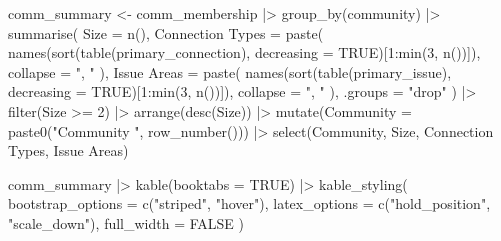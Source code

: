 \documentclass[
  letterpaper,
  DIV=11,
  numbers=noendperiod]{scrartcl}
\newenvironment{Shaded}{\begin{snugshade}}{\end{snugshade}}
\newcommand{\AttributeTok}[1]{\textcolor[rgb]{0.40,0.45,0.13}{#1}}
\newcommand{\ConstantTok}[1]{\textcolor[rgb]{0.56,0.35,0.01}{#1}}
\newcommand{\DecValTok}[1]{\textcolor[rgb]{0.68,0.00,0.00}{#1}}
\newcommand{\FunctionTok}[1]{\textcolor[rgb]{0.28,0.35,0.67}{#1}}
\newcommand{\NormalTok}[1]{\textcolor[rgb]{0.00,0.23,0.31}{#1}}
\newcommand{\OtherTok}[1]{\textcolor[rgb]{0.00,0.23,0.31}{#1}}
\newcommand{\SpecialCharTok}[1]{\textcolor[rgb]{0.37,0.37,0.37}{#1}}
\newcommand{\StringTok}[1]{\textcolor[rgb]{0.13,0.47,0.30}{#1}}
\begin{document}
\begin{Shaded}
\begin{Highlighting}[]
\NormalTok{comm\_summary }\OtherTok{\textless{}{-}}\NormalTok{ comm\_membership }\SpecialCharTok{|\textgreater{}}
  \FunctionTok{group\_by}\NormalTok{(community) }\SpecialCharTok{|\textgreater{}}
  \FunctionTok{summarise}\NormalTok{(}
    \AttributeTok{Size =} \FunctionTok{n}\NormalTok{(),}
    \StringTok{\textasciigrave{}}\AttributeTok{Connection Types}\StringTok{\textasciigrave{}} \OtherTok{=} \FunctionTok{paste}\NormalTok{(}
      \FunctionTok{names}\NormalTok{(}\FunctionTok{sort}\NormalTok{(}\FunctionTok{table}\NormalTok{(primary\_connection), }\AttributeTok{decreasing =} \ConstantTok{TRUE}\NormalTok{)[}\DecValTok{1}\SpecialCharTok{:}\FunctionTok{min}\NormalTok{(}\DecValTok{3}\NormalTok{, }\FunctionTok{n}\NormalTok{())]),}
      \AttributeTok{collapse =} \StringTok{", "}
\NormalTok{    ),}
    \StringTok{\textasciigrave{}}\AttributeTok{Issue Areas}\StringTok{\textasciigrave{}} \OtherTok{=} \FunctionTok{paste}\NormalTok{(}
      \FunctionTok{names}\NormalTok{(}\FunctionTok{sort}\NormalTok{(}\FunctionTok{table}\NormalTok{(primary\_issue), }\AttributeTok{decreasing =} \ConstantTok{TRUE}\NormalTok{)[}\DecValTok{1}\SpecialCharTok{:}\FunctionTok{min}\NormalTok{(}\DecValTok{3}\NormalTok{, }\FunctionTok{n}\NormalTok{())]),}
      \AttributeTok{collapse =} \StringTok{", "}
\NormalTok{    ),}
    \AttributeTok{.groups =} \StringTok{"drop"}
\NormalTok{  ) }\SpecialCharTok{|\textgreater{}}
  \FunctionTok{filter}\NormalTok{(Size }\SpecialCharTok{\textgreater{}=} \DecValTok{2}\NormalTok{) }\SpecialCharTok{|\textgreater{}}
  \FunctionTok{arrange}\NormalTok{(}\FunctionTok{desc}\NormalTok{(Size)) }\SpecialCharTok{|\textgreater{}}
  \FunctionTok{mutate}\NormalTok{(}\AttributeTok{Community =} \FunctionTok{paste0}\NormalTok{(}\StringTok{"Community "}\NormalTok{, }\FunctionTok{row\_number}\NormalTok{())) }\SpecialCharTok{|\textgreater{}}
  \FunctionTok{select}\NormalTok{(Community, Size, }\StringTok{\textasciigrave{}}\AttributeTok{Connection Types}\StringTok{\textasciigrave{}}\NormalTok{, }\StringTok{\textasciigrave{}}\AttributeTok{Issue Areas}\StringTok{\textasciigrave{}}\NormalTok{)}

\NormalTok{comm\_summary }\SpecialCharTok{|\textgreater{}}
  \FunctionTok{kable}\NormalTok{(}\AttributeTok{booktabs =} \ConstantTok{TRUE}\NormalTok{) }\SpecialCharTok{|\textgreater{}}
  \FunctionTok{kable\_styling}\NormalTok{(}
    \AttributeTok{bootstrap\_options =} \FunctionTok{c}\NormalTok{(}\StringTok{"striped"}\NormalTok{, }\StringTok{"hover"}\NormalTok{),}
    \AttributeTok{latex\_options =} \FunctionTok{c}\NormalTok{(}\StringTok{"hold\_position"}\NormalTok{, }\StringTok{"scale\_down"}\NormalTok{),}
    \AttributeTok{full\_width =} \ConstantTok{FALSE}
\NormalTok{  )}
\end{Highlighting}
\end{Shaded}
\end{document}
